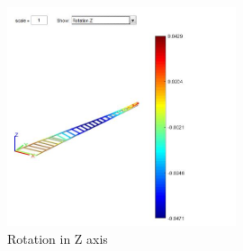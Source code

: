 \begin{figure}[h]
	\centering
	\includegraphics[width=0.6\textwidth]{img/RotationZ.jpg}
	\caption{Rotation in Z axis}
	\label{fig:rot_z}
\end{figure}

